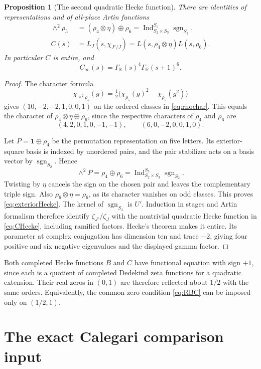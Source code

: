 \documentclass[11pt]{article}
\newtheorem{proposition}[theorem]{Proposition}
\theoremstyle{definition}
\theoremstyle{remark}
\newcommand{\R}{\mathbb R}
\newcommand{\Ind}{\operatorname{Ind}}
\newcommand{\Gr}{\Gamma_{\R}}
\newcommand{\one}{\mathbf 1}
\newcommand{\rh}{\rho_5}
\numberwithin{equation}{section}
\begin{document}
\begin{proposition}[The second quadratic Hecke function]\label{prop:secondHecke}
There are identities of representations and of all-place Artin functions
\begin{align}
\wedge^2\rh
&=(\rho_4\otimes\eta)\oplus\rho_6
=\Ind_{S_2\times S_3}^{S_5}\operatorname{sgn}_{S_3},\label{eq:exteriorHecke}\\
C(s)&=L_J(s,\chi_{J'/J})
=L(s,\rho_4\otimes\eta)L(s,\rho_6).\label{eq:CHecke}
\end{align}
In particular $C$ is entire, and
\[
C_\infty(s)=\Gr(s)^4\Gr(s+1)^6.
\]
\end{proposition}

\begin{proof}
The character formula
\[
\chi_{\wedge^2\rh}(g)
=\tfrac12\bigl(\chi_{\rh}(g)^2-\chi_{\rh}(g^2)\bigr)
\]
gives $(10,-2,-2,1,0,0,1)$ on the ordered classes in \eqref{eq:rhochar}. This equals the character of $\rho_4\otimes\eta\oplus\rho_6$, since the respective characters of $\rho_4$ and $\rho_6$ are
\[
(4,2,0,1,0,-1,-1),\qquad(6,0,-2,0,0,1,0).
\]

Let $P=\one\oplus\rho_4$ be the permutation representation on five letters. Its exterior-square basis is indexed by unordered pairs, and the pair stabilizer acts on a basis vector by $\operatorname{sgn}_{S_2}$. Hence
\[
\wedge^2P=\rho_4\oplus\rho_6
=\Ind_{S_2\times S_3}^{S_5}\operatorname{sgn}_{S_2}.
\]
Twisting by $\eta$ cancels the sign on the chosen pair and leaves the complementary triple sign. Also $\rho_6\otimes\eta=\rho_6$, as its character vanishes on odd classes. This proves \eqref{eq:exteriorHecke}. The kernel of $\operatorname{sgn}_{S_3}$ is $U'$. Induction in stages and Artin formalism therefore identify $\zeta_{J'}/\zeta_J$ with the nontrivial quadratic Hecke function in \eqref{eq:CHecke}, including ramified factors. Hecke's theorem makes it entire. Its parameter at complex conjugation has dimension ten and trace $-2$, giving four positive and six negative eigenvalues and the displayed gamma factor.
\end{proof}

Both completed Hecke functions $B$ and $C$ have functional equation with sign $+1$, since each is a quotient of completed Dedekind zeta functions for a quadratic extension. Their real zeros in $(0,1)$ are therefore reflected about $1/2$ with the same orders. Equivalently, the common-zero condition \eqref{eq:RBC} can be imposed only on $(1/2,1)$.

\section{The exact Calegari comparison input}
\end{document}
